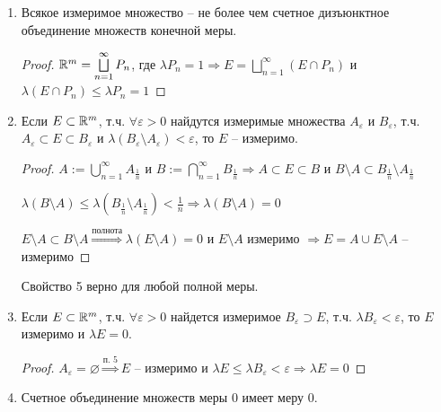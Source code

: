 \begin{enumerate}
    \item Всякое измеримое множество – не более чем счетное дизъюнктное объединение множеств конечной меры.
    
    \begin{proof}
        $\mathbb{R}^m =\bigsqcup\limits_{n=1}^\infty P_n$, где $\lambda P_n = 1\Rightarrow E =\bigsqcup\limits_{n=1}^\infty (E\cap P_n)$ и
        $\lambda (E\cap P_n)\leq \lambda P_n = 1$
    \end{proof}

    \item Если $E\subset \mathbb{R}^m$, т.ч. $\forall \varepsilon > 0$ найдутся измеримые множества
    $A_\varepsilon$ и $B_\varepsilon$, т.ч. $A_\varepsilon\subset E \subset B_\varepsilon$ и 
    $\lambda (B_\varepsilon\setminus A_\varepsilon)< \varepsilon$, то $E$ – измеримо.
    
    \begin{proof}
        $A:=\bigcup\limits_{n=1}^\infty A_{\frac{1}{n}}$ и $B:=\bigcap\limits_{n=1}^\infty B_{\frac{1}{n}}\Rightarrow
        A\subset E \subset B$ и $B\setminus A \subset B_{\frac{1}{n}}\setminus A_{\frac{1}{n}}$

        $\lambda (B\setminus A)\leq \lambda (B_{\frac{1}{n}}\setminus A_{\frac{1}{n}})<\frac{1}{n}\Rightarrow \lambda (B\setminus A) = 0$

        $E\setminus A\subset B\setminus A\overset{\text{полнота}}{\Rightarrow} \lambda (E\setminus A)=0$ и $E\setminus A$ измеримо
        $\Rightarrow E= A\cup E\setminus A$ – измеримо
    \end{proof}

    \begin{remark}
        Свойство 5 верно для любой полной меры.
    \end{remark}

    \item Если $E\subset \mathbb{R}^m$, т.ч. $\forall \varepsilon > 0$ найдется измеримое
    $B_\varepsilon\supset E$, т.ч. $\lambda B_\varepsilon< \varepsilon$, то $E$ измеримо и $\lambda E = 0$.

    \begin{proof}
        $A_\varepsilon = \varnothing\overset{\text{п. 5}}{\Rightarrow} E$ – измеримо и $\lambda E\leq \lambda B_\varepsilon < \varepsilon
        \Rightarrow \lambda E = 0$
    \end{proof}

    \item Счетное объединение множеств меры 0 имеет меру 0.
    

\end{enumerate}
